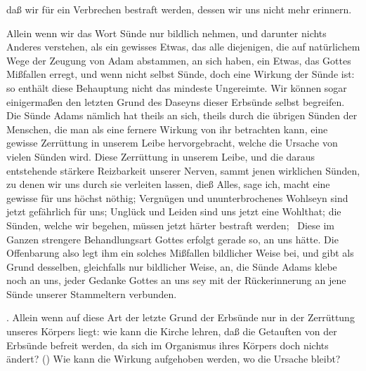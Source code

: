 \begin{aufza}
\begin{aufzb}
\item daß wir für ein Verbrechen bestraft werden, dessen wir uns nicht mehr erinnern.
\end{aufzb}
Allein wenn wir das Wort Sünde nur bildlich nehmen, und darunter nichts Anderes verstehen, als ein gewisses Etwas, das alle diejenigen, die auf natürlichem Wege der Zeugung von Adam abstammen, an sich haben, ein Etwas, das Gottes Mißfallen erregt, und wenn nicht selbst Sünde, doch eine Wirkung der Sünde ist: so enthält diese Behauptung nicht das mindeste Ungereimte. Wir können sogar einigermaßen den letzten Grund des Daseyns dieser Erbsünde selbst begreifen. Die Sünde Adams nämlich hat theils an sich, theils durch die übrigen Sünden der Menschen, die man als eine fernere Wirkung von ihr betrachten kann, eine gewisse Zerrüttung in unserem Leibe hervorgebracht, welche die Ursache von vielen Sünden wird. Diese Zerrüttung in unserem Leibe, und die daraus entstehende stärkere Reizbarkeit unserer Nerven, sammt jenen wirklichen Sünden, zu denen wir uns durch sie verleiten lassen, dieß Alles, sage ich, macht eine gewisse  für uns höchst nöthig; Vergnügen und ununterbrochenes Wohlseyn sind jetzt gefährlich für uns; Unglück und Leiden sind uns jetzt eine Wohlthat; die Sünden, welche wir begehen, müssen jetzt härter bestraft werden; \usw\ Diese im Ganzen strengere Behandlungsart Gottes erfolgt gerade so,  an uns hätte. Die Offenbarung also legt ihm ein solches Mißfallen bildlicher Weise bei, und gibt als Grund desselben, gleichfalls nur bildlicher Weise, an, die Sünde Adams klebe noch an uns, jeder Gedanke Gottes an uns sey mit der Rückerinnerung an jene Sünde unserer Stammeltern verbunden.\par
{}. Allein wenn auf diese Art der letzte Grund der Erbsünde nur in der Zerrüttung unseres Körpers liegt: wie kann die Kirche lehren, daß die Getauften von der Erbsünde befreit werden, da sich im Organismus ihres Körpers doch nichts ändert? () Wie kann die Wirkung aufgehoben werden, wo die Ursache bleibt?\par

\end{aufza}
